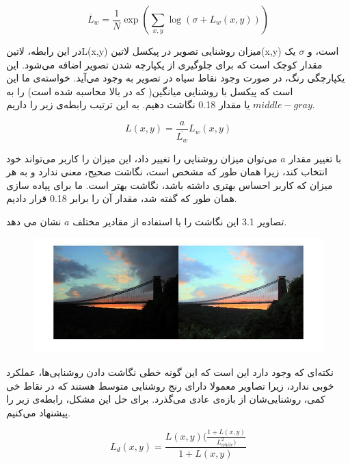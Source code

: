 \begin{equation}
	\overline L_{w} = \frac{1}{N} \exp (\sum_{x,y} \log(\sigma + L_{w}(x,y))) 
\end{equation}

در این رابطه، 
‌لاتین{L(x,y)}
میزان روشنایی تصویر در پیکسل 
‌لاتین{(x,y) }
است، و $\sigma$ یک مقدار کوچک است که برای جلوگیری از یکپارچه شدن تصویر اضافه می‌شود. این یکپارچگی رنگ، در صورت وجود نقاط سیاه در تصویر به وجود می‌آید.
خواسته‌ی ما این است که پیکسل با روشنایی میانگین( که در بالا محاسبه شده است) را به $middle-gray$ یا مقدار 0.18 نگاشت دهیم. به این ترتیب رابطه‌ی زیر را داریم. 

\begin{equation}
	L(x,y) = \frac{a}{\overline{L_{w}}}L_{w}(x,y)
\end{equation}

با تغییر مقدار   $a$ می‌توان میزان روشنایی را تغییر داد، این میزان را کاربر می‌تواند خود انتخاب کند، زیرا همان طور که مشخص است، نگاشت صحیح، معنی ندارد و به هر میزان که کاربر احساس بهتری داشته باشد، نگاشت بهتر است. ما برای پیاده سازی همان طور که گفته شد، مقدار آن را برابر 0.18 قرار دادیم.

تصاویر 3.1 این نگاشت را با استفاده از مقادیر مختلف $a$ نشان می دهد.

\begin{figure}[!htb]
	\includegraphics[width=\linewidth]{images/reinharda}
	\caption{}\label{fig:logtonemap}
	\endminipage\hfill
\end{figure}


نکته‌ای که وجود دارد این است که این گونه خطی نگاشت دادن روشنایی‌ها، عملکرد خوبی ندارد، زیرا تصاویر معمولا دارای رنج روشنایی متوسط هستند که در نقاط خی کمی، روشنایی‌شان از بازه‌ی عادی می‌گذرد. برای حل این مشکل، رابطه‌ی زیر را پیشنهاد می‌کنیم.

\begin{equation}
	L_{d}(x,y) = \frac{L(x,y) (\frac{1+L(x,y)}{L^{2}_{white})}}{1 + L(x,y) }
\end{equation}

